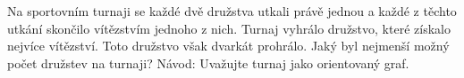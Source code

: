 \subsubsection{}
Na sportovním turnaji se každé dvě družstva utkali právě jednou a každé z těchto
utkání skončilo vítězstvím jednoho z nich. Turnaj vyhrálo družstvo, které
získalo nejvíce vítězství. Toto družstvo však dvarkát prohrálo. Jaký byl
nejmenší možný počet družstev na turnaji? Návod: Uvažujte turnaj jako
orientovaný graf.

